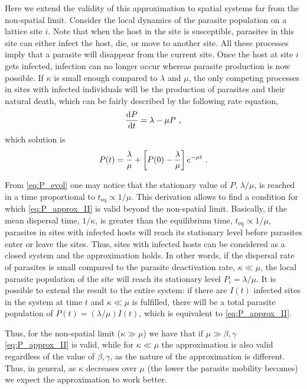 Here we extend the validity of this approximation to spatial systems far
from the non-spatial limit. Consider the local dynamics of the parasite
population on a lattice site $i$. Note that when the host in the site is
susceptible, parasites in this site can either infect the host, die, or move to
another site. All these processes imply that a parasite will disappear from the
current site. Once the host at site $i$ gets infected, infection can no longer
occur whereas parasite production is now possible. If $\kappa$ is small enough
compared to $\lambda$ and $\mu$,  the only competing processes in sites with
infected individuals will be the production of parasites and their natural
death, which can be fairly described by the following rate equation,
\begin{equation}
    \frac{\mathrm{d} P}{\mathrm{d} t}=\lambda-\mu P \ ,
\end{equation}
which solution is
\begin{equation}\label{eq:P_evol}
    P(t)=\frac{\lambda}{\mu}+\left[P(0)-\frac{\lambda}{\mu}\right]e^{-\mu t}
    \ .
\end{equation}

From \cref{eq:P_evol} one may notice that the stationary value of $P$,
$\lambda/\mu$, is reached in a time proportional to $t_{\textrm{eq}}\propto
    1/\mu$. This derivation allows to find a condition for which
\cref{eq:P_approx_II}
is valid beyond the non-spatial limit. Basically, if the mean dispersal time,
$1/\kappa$, is greater than the equilibrium time, $t_{\textrm{eq}}\propto
    1/\mu$, parasites in sites with infected hosts will reach its stationary
level
before parasites enter or leave the sites. Thus, sites with infected hosts can
be considered as a closed system and the approximation holds. In other words,
if the dispersal rate of parasites is small compared to the parasite
deactivation rate, $\kappa \ll \mu$, the local parasite population of the site
will reach its stationary level $P_i=\lambda/\mu$. It is possible to extend the
result to the entire system: if there are $I(t)$ infected sites in the system
at time $t$ and $\kappa\ll\mu$ is fulfilled, there will be a total parasite
population of $P(t)=(\lambda/\mu) I(t)$, which is equivalent to
\cref{eq:P_approx_II}.

Thus, for the non-spatial limit ($\kappa\gg\mu$) we have that if
$\mu\gg\beta,\gamma$ \cref{eq:P_approx_II} is valid, while for $\kappa\ll\mu$
the
approximation is also valid regardless of the value of $\beta,\gamma$, as the
nature of the approximation is different. Thus, in general, as $\kappa$
decreases over $\mu$ (the lower the parasite mobility becomes) we expect the
approximation to work better.

